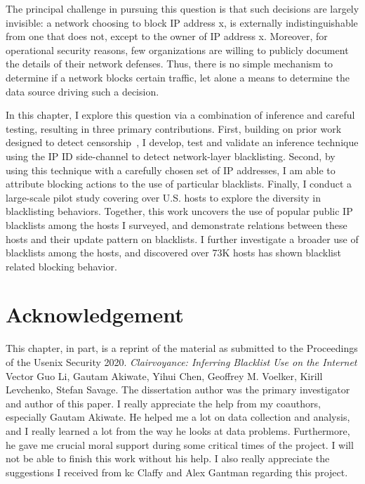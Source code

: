 The principal challenge in pursuing this question is that such
decisions are largely invisible: a network choosing to block IP
address x, is externally indistinguishable from one that does not, except 
to the owner of IP address x.  Moreover, for operational security reasons,
few organizations are willing to publicly document the details of
their network defenses. Thus, there is no simple mechanism to
determine if a network blocks certain traffic, let alone a means to
determine the data source driving such a decision.

In this chapter, I explore this question via a combination of inference
and careful testing, resulting in three primary contributions.
First, building on prior work designed to detect
censorship~\cite{ensafi2014detecting, pearce2017augur}, I develop,
test and validate an inference technique using the IP ID side-channel to
detect network-layer blacklisting.  Second, by using this technique with 
a carefully chosen set of IP addresses, I am able to attribute
blocking actions to the use of particular blacklists. Finally, I conduct 
a large-scale pilot study covering over {} U.S. hosts
to explore the diversity in blacklisting behaviors. Together, this work
uncovers the use of {\blacklistnum} popular public IP blacklists among
the hosts I surveyed, and demonstrate relations between these hosts
and their update pattern on blacklists. I further investigate a broader
use of blacklists among the hosts, and discovered over 73K hosts has
shown blacklist related blocking behavior.





%
%
%








%


\section{Acknowledgement}
This chapter, in part, is a reprint of the material as 
submitted to the Proceedings of the Usenix Security 2020. \textit{
Clairvoyance: Inferring Blacklist Use on the Internet} Vector Guo Li, 
Gautam Akiwate, Yihui Chen, Geoffrey M. Voelker, Kirill Levchenko, Stefan 
Savage. The dissertation author was the primary investigator and author of 
this paper. I really appreciate the help from my coauthors, especially 
Gautam Akiwate. He helped me a lot on data collection and analysis,
and I really learned a lot from the way he looks at data problems. 
Furthermore, he gave me crucial moral support during some critical times
of the project. I will not be able to finish this work without his help.
I also really appreciate the suggestions I received from kc Claffy and 
Alex Gantman regarding this project.